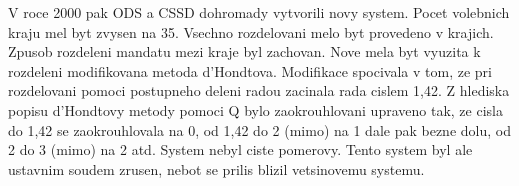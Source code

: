 \documentclass[12pt,a4paper]{article}
\begin{document}
V roce 2000 pak ODS a CSSD dohromady vytvorili novy system. Pocet volebnich kraju mel byt zvysen na 35. Vsechno rozdelovani melo byt provedeno v krajich. Zpusob rozdeleni mandatu mezi kraje byl zachovan. Nove mela byt vyuzita k rozdeleni modifikovana metoda d'Hondtova. Modifikace spocivala v tom, ze pri rozdelovani pomoci postupneho deleni radou zacinala rada cislem 1,42. Z hlediska popisu d'Hondtovy metody pomoci Q bylo zaokrouhlovani upraveno tak, ze cisla do 1,42 se zaokrouhlovala na 0, od 1,42 do 2 (mimo) na 1 dale pak bezne dolu, od 2 do 3 (mimo) na 2 atd. System nebyl ciste pomerovy. Tento system byl ale ustavnim soudem zrusen, nebot se prilis blizil vetsinovemu systemu.  
\end{document}
